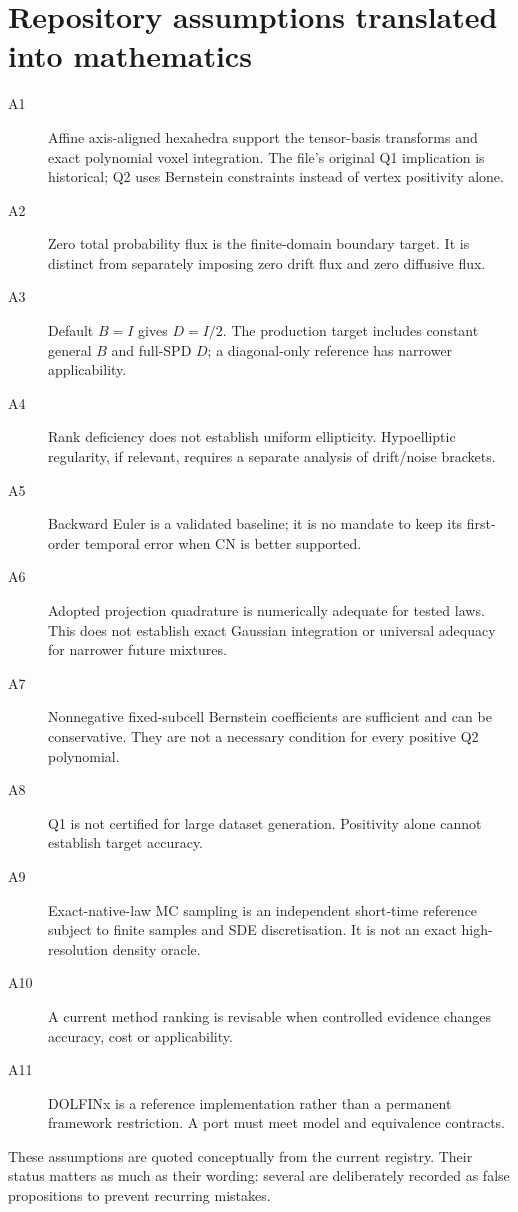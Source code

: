\section{Repository assumptions translated into mathematics}
\begin{description}
\item[A1] Affine axis-aligned hexahedra support the tensor-basis transforms and exact polynomial voxel integration. The file's original Q1 implication is historical; Q2 uses Bernstein constraints instead of vertex positivity alone.
\item[A2] Zero total probability flux is the finite-domain boundary target. It is distinct from separately imposing zero drift flux and zero diffusive flux.
\item[A3] Default $B=I$ gives $D=I/2$. The production target includes constant general $B$ and full-SPD $D$; a diagonal-only reference has narrower applicability.
\item[A4] Rank deficiency does not establish uniform ellipticity. Hypoelliptic regularity, if relevant, requires a separate analysis of drift/noise brackets.
\item[A5] Backward Euler is a validated baseline; it is no mandate to keep its first-order temporal error when CN is better supported.
\item[A6] Adopted projection quadrature is numerically adequate for tested laws. This does not establish exact Gaussian integration or universal adequacy for narrower future mixtures.
\item[A7] Nonnegative fixed-subcell Bernstein coefficients are sufficient and can be conservative. They are not a necessary condition for every positive Q2 polynomial.
\item[A8] Q1 is not certified for large dataset generation. Positivity alone cannot establish target accuracy.
\item[A9] Exact-native-law MC sampling is an independent short-time reference subject to finite samples and SDE discretisation. It is not an exact high-resolution density oracle.
\item[A10] A current method ranking is revisable when controlled evidence changes accuracy, cost or applicability.
\item[A11] DOLFINx is a reference implementation rather than a permanent framework restriction. A port must meet model and equivalence contracts.
\end{description}
These assumptions are quoted conceptually from the current registry. Their status matters as much as their wording: several are deliberately recorded as false propositions to prevent recurring mistakes.

